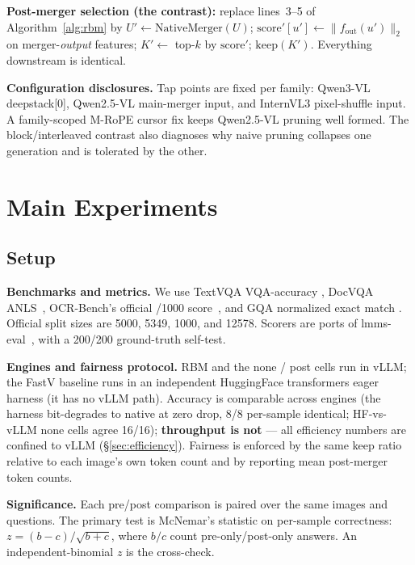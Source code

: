\documentclass[sigconf,review,anonymous]{acmart}
\begin{document}
\noindent\textbf{Post-merger selection (the contrast):} replace lines~3--5 of
Algorithm~\ref{alg:rbm} by $U' \gets \mathrm{NativeMerger}(U)$;
$\mathrm{score}'[u'] \gets \| f_{\mathrm{out}}(u') \|_2$ on merger-\emph{output}
features; $K' \gets$ top-$k$ by $\mathrm{score}'$; $\mathrm{keep}(K')$.
Everything downstream is identical.

\textbf{Configuration disclosures.} Tap points are fixed per family: Qwen3-VL
deepstack[0], Qwen2.5-VL main-merger input, and InternVL3 pixel-shuffle input.
A family-scoped M-RoPE cursor fix keeps Qwen2.5-VL pruning well formed. The
block/interleaved contrast also diagnoses why naive pruning collapses one
generation and is tolerated by the other.

\section{Main Experiments}\label{sec:experiments}

\subsection{Setup}\label{sec:setup}

\textbf{Benchmarks and metrics.} We use TextVQA VQA-accuracy
\cite{singh2019textvqa}, DocVQA ANLS~\cite{mathew2021docvqa}, OCR-Bench's
official /1000 score~\cite{liu2024ocrbench}, and GQA normalized exact match
\cite{hudson2019gqa}. Official split sizes are 5000, 5349, 1000, and 12578.
Scorers are ports of lmms-eval~\cite{zhang2024lmmseval}, with a 200/200
ground-truth self-test.

\textbf{Engines and fairness protocol.} RBM and the none / post cells run in
vLLM; the FastV baseline runs in an independent HuggingFace transformers eager
harness (it has no vLLM path). Accuracy is comparable across engines (the harness
bit-degrades to native at zero drop, 8/8 per-sample identical; HF-vs-vLLM none
cells agree 16/16); \textbf{throughput is not} --- all efficiency numbers are
confined to vLLM (\S\ref{sec:efficiency}). Fairness is enforced by the same keep
ratio relative to each image's own token count and by reporting mean
post-merger token counts.

\textbf{Significance.} Each pre/post comparison is paired over the same
images and questions. The primary test is McNemar's statistic on per-sample
correctness: $z=(b-c)/\sqrt{b+c}$, where $b/c$ count pre-only/post-only answers.
An independent-binomial $z$ is the cross-check.
\end{document}
